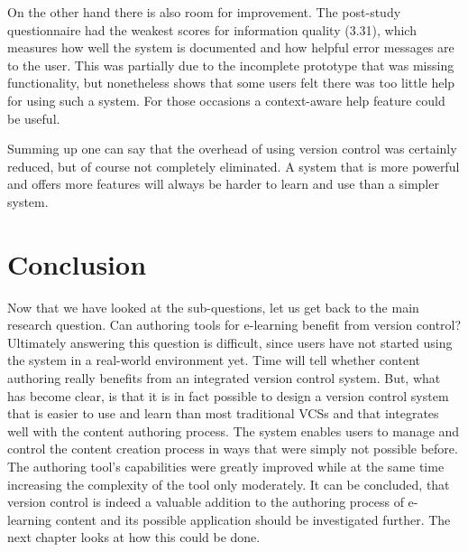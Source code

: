 On the other hand there is also room for improvement. The post-study questionnaire had the weakest scores for information quality (3.31), which measures how well the system is documented and how helpful error messages are to the user. This was partially due to the incomplete prototype that was  missing functionality, but nonetheless shows that some users felt there was too little help for using such a system. For those occasions a context-aware help feature could be useful.

Summing up one can say that the overhead of using version control was certainly reduced, but of course not completely eliminated. A system that is more powerful and offers more features will always be harder to learn and use than a simpler system.


\section{Conclusion}
Now that we have looked at the sub-questions, let us get back to the main research question. Can authoring tools for e-learning benefit from version control? Ultimately answering this question is difficult, since users have not started using the system in a real-world environment yet. Time will tell whether content authoring really benefits from an integrated version control system. But, what has become clear, is that it is in fact possible to design a version control system that is easier to use and learn than most traditional VCSs and that integrates well with the content authoring process. The system enables users to manage and control the content creation process in ways that were simply not possible before. The authoring tool's capabilities were greatly improved while at the same time increasing the complexity of the tool only moderately. It can be concluded, that version control is indeed a valuable addition to the authoring process of e-learning content and its possible application should be investigated further. The next chapter looks at how this could be done.









